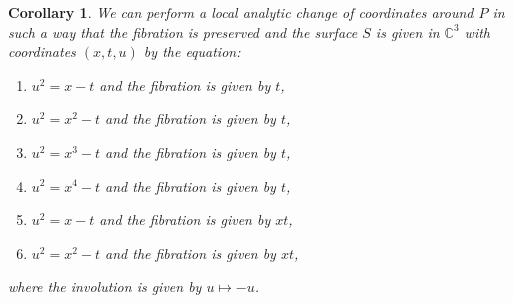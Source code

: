 \documentclass[a4paper]{amsart}
\theoremstyle{plain}
\newtheorem{Cor}[Thm]{Corollary}
\theoremstyle{definition}
\theoremstyle{remark}
\numberwithin{equation}{section}
\begin{document}
\begin{Cor}
	We can perform a local analytic change of coordinates around $P$ in such
	a way that the fibration is preserved and the surface $S$ is given in
	$\mathbb{C}^3$ with coordinates $(x,t,u)$ by the equation:
	\begin{enumerate}
		\item [$\mathrm{I}_{0}$:] $u^2 = x - t$ and the fibration is given by $t$,
		\item [$\mathrm{I}_{n}$:] $u^2 = x^2 		- t$ and the fibration is given by $t$,
		\item [$\mathrm{II}$:] $u^2 = x^3 - t$ and the fibration is given by $t$,
		\item [$\mathrm{III}^{a}$] $u^2 = x^4 - t$ and the fibration is given by $t$,
		\item [$\mathrm{III}^{b}$:] $u^2 = x - t$ and the fibration is given by $xt$,
		\item [$\mathrm{IV}$:] $u^2 = x^2 - t$ and the fibration is given by $xt$,
	\end{enumerate}
	where the involution is given by $u \mapsto -u$.
\end{Cor}
\end{document}
